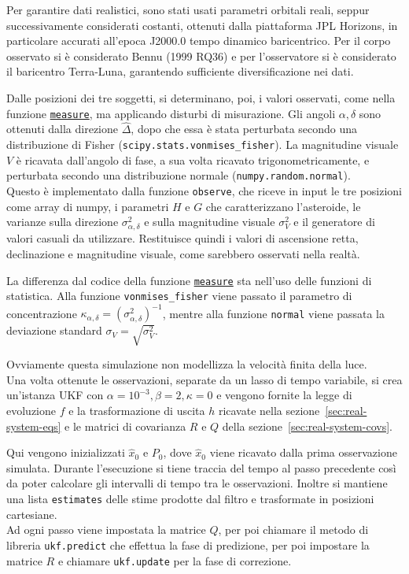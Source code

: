 \documentclass[12pt,a4paper,openright,twoside]{book}
\begin{document}
Per garantire dati realistici, sono stati usati parametri orbitali reali, seppur successivamente considerati costanti, ottenuti dalla piattaforma JPL Horizons, in particolare accurati all'epoca J2000.0 tempo dinamico baricentrico. Per il corpo osservato si è considerato Bennu (1999 RQ36) e per l'osservatore si è considerato il baricentro Terra-Luna, garantendo sufficiente diversificazione nei dati.

Dalle posizioni dei tre soggetti, si determinano, poi, i valori osservati, come nella funzione \hyperref[lst:measure]{\lstinline{measure}}, ma applicando disturbi di misurazione. Gli angoli $\alpha,\delta$ sono ottenuti dalla direzione $\hat{\Delta}$, dopo che essa è stata perturbata secondo una distribuzione di Fisher (\lstinline{scipy.stats.vonmises_fisher}). La magnitudine visuale $V$ è ricavata dall'angolo di fase, a sua volta ricavato trigonometricamente, e perturbata secondo una distribuzione normale (\lstinline{numpy.random.normal}). \\

Questo è implementato dalla funzione \lstinline{observe}, che riceve in input le tre posizioni come array di numpy, i parametri $H$ e $G$ che caratterizzano l'asteroide, le varianze sulla direzione $\sigma^2_{\alpha,\delta}$ e sulla magnitudine visuale $\sigma^2_V$ e il generatore di valori casuali da utilizzare. Restituisce quindi i valori di ascensione retta, declinazione e magnitudine visuale, come sarebbero osservati nella realtà.

La differenza dal codice della funzione \hyperref[lst:measure]{\lstinline{measure}} sta nell'uso delle funzioni di statistica. Alla funzione \lstinline{vonmises_fisher} viene passato il parametro di concentrazione $\kappa_{\alpha,\delta}=(\sigma_{\alpha,\delta}^2)^{-1}$, mentre alla funzione \lstinline{normal} viene passata la deviazione standard $\sigma_V=\sqrt{\sigma_V^2}$.

Ovviamente questa simulazione non modellizza la velocità finita della luce. \\

Una volta ottenute le osservazioni, separate da un lasso di tempo variabile, si crea un'istanza UKF con $\alpha=10^{-3},\beta=2,\kappa=0$ e vengono fornite la legge di evoluzione $f$ e la trasformazione di uscita $h$ ricavate nella sezione~\ref{sec:real-system-eqs} e le matrici di covarianza $R$ e $Q$ della sezione~\ref{sec:real-system-covs}.

Qui vengono inizializzati $\hat{x}_0$ e $P_0$, dove $\hat{x}_0$ viene ricavato dalla prima osservazione simulata. Durante l'esecuzione si tiene traccia del tempo al passo precedente così da poter calcolare gli intervalli di tempo tra le osservazioni. Inoltre si mantiene una lista \lstinline{estimates} delle stime prodotte dal filtro e trasformate in posizioni cartesiane. \\
Ad ogni passo viene impostata la matrice $Q$, per poi chiamare il metodo di libreria \lstinline{ukf.predict} che effettua la fase di predizione, per poi impostare la matrice $R$ e chiamare \lstinline{ukf.update} per la fase di correzione.
\end{document}
